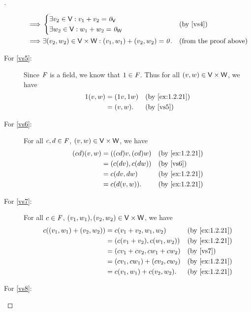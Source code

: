\begin{proof}[]
\begin{description}
\begin{align*}
				\implies & \begin{dcases}
					\exists v_2 \in \mathsf{V} : v_1 + v_2 = \mathit{0}_{\mathsf{V}} \\
					\exists w_2 \in \mathsf{V} : w_1 + w_2 = \mathit{0}_{\mathsf{W}}
				\end{dcases}                                           &  & \text{(by \ref{vs4})}         \\
				\implies & \exists (v_2, w_2) \in \mathsf{V} \times \mathsf{W} : (v_1, w_1) + (v_2, w_2) = \mathit{0}. &  & \text{(from the proof above)}
			\end{align*}
		\item[For \ref{vs5}:]
			Since \(\mathit{F}\) is a field, we know that \(1 \in \mathit{F}\).
			Thus for all \((v, w) \in \mathsf{V} \times \mathsf{W}\), we have
			\begin{align*}
				1(v, w) & = (1v, 1w) &  & \text{(by \cref{ex:1.2.21})} \\
				        & = (v, w).  &  & \text{(by \ref{vs5})}
			\end{align*}
		\item[For \ref{vs6}:]
			For all \(c, d \in \mathit{F}\), \((v, w) \in \mathsf{V} \times \mathsf{W}\), we have
			\begin{align*}
				(cd) (v, w) & = ((cd) v, (cd) w) &  & \text{(by \cref{ex:1.2.21})} \\
				            & = (c(dv), c(dw))   &  & \text{(by \ref{vs6})}        \\
				            & = c (dv, dw)       &  & \text{(by \cref{ex:1.2.21})} \\
				            & = c(d(v, w)).      &  & \text{(by \cref{ex:1.2.21})}
			\end{align*}
		\item[For \ref{vs7}:]
			For all \(c \in \mathit{F}\), \((v_1, w_1), (v_2, w_2) \in \mathsf{V} \times \mathsf{W}\), we have
			\begin{align*}
				c ((v_1, w_1) + (v_2, w_2)) & = c (v_1 + v_2, w_1, w_2)     &  & \text{(by \cref{ex:1.2.21})} \\
				                            & = (c(v_1 + v_2), c(w_1, w_2)) &  & \text{(by \cref{ex:1.2.21})} \\
				                            & = (cv_1 + cv_2, cw_1 + cw_2)  &  & \text{(by \ref{vs7})}        \\
				                            & = (cv_1, cw_1) + (cv_2, cw_2) &  & \text{(by \cref{ex:1.2.21})} \\
				                            & = c(v_1, w_1) + c(v_2, w_2).  &  & \text{(by \cref{ex:1.2.21})}
			\end{align*}
		\item[For \ref{vs8}:]

\end{description}
\end{proof}
